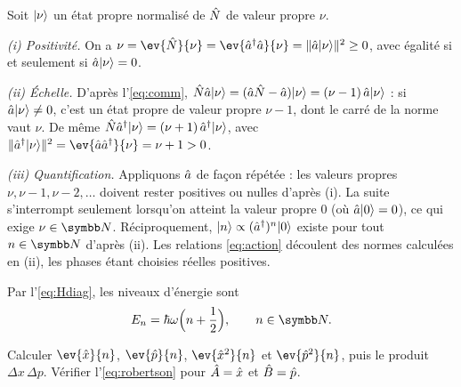 \begin{solution}
  Soit $\lvert\nu\rangle$ un état propre normalisé de $\hat{N}$ de valeur propre
  $\nu$.

  \emph{(i) Positivité.} On a
  $\nu=\ev{\op{N}}{\nu}=\ev{\op{a}\adj\op{a}}{\nu}=\norm{\op{a}\ket{\nu}}^{2}\geq 0$,
  avec égalité si et seulement si $\hat{a}\lvert\nu\rangle=0$.

  \emph{(ii) Échelle.} D'après l'\cref{eq:comm},
  $\hat{N}\hat{a}\lvert\nu\rangle=(\hat{a}\hat{N}-\hat{a})\lvert\nu\rangle=(\nu-1)\,\hat{a}\lvert\nu\rangle$ :
  si $\hat{a}\lvert\nu\rangle\neq0$, c'est un état propre de valeur propre $\nu-1$,
  dont le carré de la norme vaut $\nu$. De même
  $\hat{N}\hat{a}^{\dagger}\lvert\nu\rangle=(\nu+1)\,\hat{a}^{\dagger}\lvert\nu\rangle$, avec
  $\norm{\op{a}\adj\ket{\nu}}^{2}=\ev{\op{a}\op{a}\adj}{\nu}=\nu+1>0$.

  \emph{(iii) Quantification.} Appliquons $\hat{a}$ de façon répétée : les
  valeurs propres $\nu,\nu-1,\nu-2,\dots$ doivent rester positives ou
  nulles d'après (i). La suite s'interrompt seulement lorsqu'on atteint la
  valeur propre $0$ (où $\hat{a}\lvert0\rangle=0$), ce qui exige $\nu\in\NN$. Réciproquement,
  $\lvert n\rangle\propto(\hat{a}^{\dagger})^{n}\lvert0\rangle$ existe pour tout $n\in\NN$ d'après
  (ii). Les relations \eqref{eq:action} découlent des normes calculées en (ii),
  les phases étant choisies réelles positives.

  Par l'\cref{eq:Hdiag}, les niveaux d'énergie sont
  \begin{equation}
    E_{n}=\hbar\omega\Bigl(n+\frac12\Bigr),\qquad n\in\NN .
    \label{eq:En}
  \end{equation}
\end{solution}

\begin{question}[4 pts]\label{q:dispersions}
  Calculer $\ev{\op{x}}{n}$, $\ev{\op{p}}{n}$, $\ev{\op{x}^{2}}{n}$ et
  $\ev{\op{p}^{2}}{n}$, puis le produit $\Delta x\,\Delta p$. Vérifier
  l'\cref{eq:robertson} pour $\hat{A}=\hat{x}$ et $\hat{B}=\hat{p}$.
\end{question}

